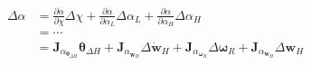 \begin{equation}
    \begin{split}
        \Delta \alpha &= \frac{\partial\alpha}{\partial\chi}\Delta\chi + \frac{\partial\alpha}{\partial\alpha_L}\Delta\alpha_L + \frac{\partial\alpha}{\partial\alpha_H}\Delta\alpha_H \\
        &= \cdots \\
        &= \mathbf{J}_{\alpha_{\boldsymbol{\theta}_{\Delta H}}}\boldsymbol{\theta}_{\Delta H} + \mathbf{J}_{\alpha_{\dot{\mathbf{w}}_H}}\Delta {\dot{\mathbf{w}}}_H + \mathbf{J}_{\alpha_{\boldsymbol{\omega}_R}}\Delta \boldsymbol{\omega}_R + \mathbf{J}_{\alpha_{\mathbf{w}_H}}\Delta {\mathbf{w}}_H\\
    \end{split}
\end{equation}

